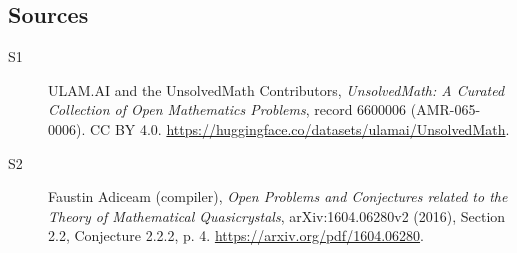 \documentclass[11pt]{article}
\begin{document}
\subsection{Sources}
\begin{description}
\item[\hypertarget{source:6600006:1}{S1}] ULAM.AI and the UnsolvedMath Contributors, \emph{UnsolvedMath: A Curated Collection of Open Mathematics Problems}, record 6600006 (AMR-065-0006). CC BY 4.0. \url{https://huggingface.co/datasets/ulamai/UnsolvedMath}.
\item[\hypertarget{source:6600006:2}{S2}] Faustin Adiceam (compiler), \emph{Open Problems and Conjectures related to the Theory of Mathematical Quasicrystals}, arXiv:1604.06280v2 (2016), Section 2.2, Conjecture 2.2.2, p. 4. \url{https://arxiv.org/pdf/1604.06280}.
\end{description}
\label{end:6600006}
\end{document}

